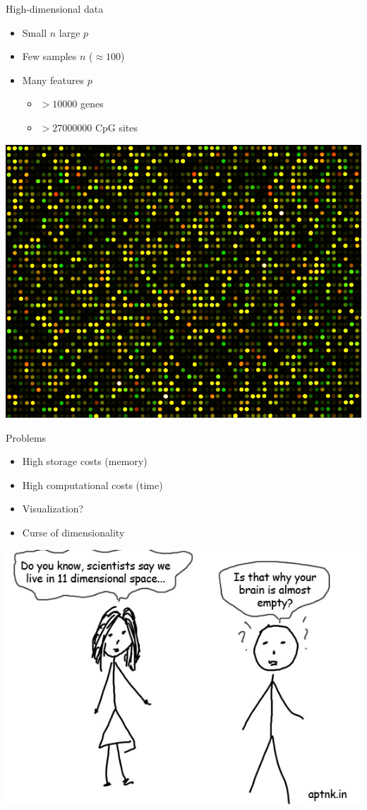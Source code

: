 \documentclass{beamer}\usepackage[]{graphicx}\usepackage[]{color}
\begin{document}
\begin{frame}{High-dimensional data}
  \begin{itemize}
    \item \alert{Small $n$ large $p$}
    \item Few samples $n$ ($\approx 100$)
    \item Many features $p$
      \begin{itemize}
        \item $> 10000$ genes
        \item $> 27000000$ CpG sites
      \end{itemize}
  \end{itemize}
  \begin{center}
    \includegraphics[width=.5\linewidth]{microarray.jpg}
  \end{center}
\end{frame}

\begin{frame}{Problems}
  \begin{itemize}
    \item High storage costs (memory)
    \item High computational costs (time)
    \item Visualization?
    \item Curse of dimensionality
  \end{itemize}
  \begin{center}
    \includegraphics[width=.5\linewidth]{curse_dim.jpg}
  \end{center}
\end{frame}
\end{document}
